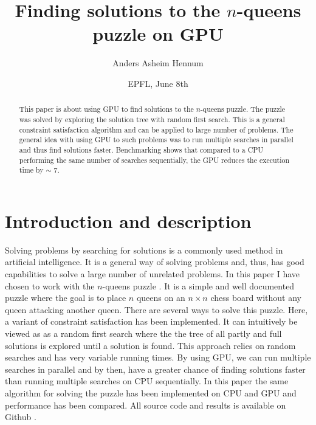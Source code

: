 \documentclass{article}
\title{Finding solutions to the $n$-queens puzzle on GPU}
\author{Anders Asheim Hennum}
\date{EPFL, June 8th}
\begin{document}
\maketitle

\begin{abstract}
This paper is about using GPU to find solutions to the $n$-queens puzzle. The puzzle was
solved by exploring the solution tree with random first search. This is a general constraint
satisfaction algorithm and can be applied to large number of problems. The general idea with using GPU to
such problems was to run multiple searches in parallel and thus find solutions faster. Benchmarking shows that compared to a CPU performing
the same number of searches sequentially, the GPU reduces the execution time by $\sim$ 7.

\end{abstract}

\section{Introduction and description}

Solving problems by searching for solutions is a commonly used method in artificial intelligence. 
It is a general way of solving problems and, thus, has good capabilities to solve a large number of unrelated problems. 
In this paper I have chosen to work with the $n$-queens puzzle \cite{nqueen}. 
It is a simple and well documented puzzle where the goal is to place $n$ queens on an $n \times n$ chess
board without any queen attacking another queen. There are several ways to solve this puzzle. Here, a variant 
of constraint satisfaction \cite{constraint} has been implemented. It can intuitively be viewed as as a random first search where
the the tree of all partly and full solutions is explored until a solution is found.  
This approach relies on random searches and has very variable running times.
By using GPU, we can run multiple searches in parallel and by then, have a greater chance of finding
solutions faster than running multiple searches on CPU sequentially. In this paper the same algorithm for solving the 
puzzle has been implemented on CPU and GPU and performance has been compared. All source code and results
is available on Github \cite{github}.
\end{document}
